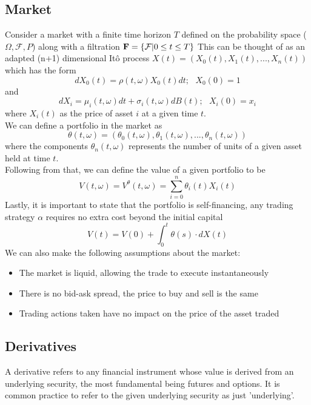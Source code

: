 \documentclass[12pt]{article}
\numberwithin{equation}{section}
\begin{document}
\subsection{Market}
Consider a market with a finite time horizon $T$ defined on the probability space 
($\Omega,\mathcal{F},P$) along with a filtration $\bold{F} = \{\mathcal{F}| 0 \leq t \leq T \}$ 
This can be thought of as an adapted (n+1) dimensional It\^{o} process 
$X(t) = (X_0(t), X_1(t),...,X_n(t))$
which has the form 
\begin{equation}
dX_0(t) = \rho(t,\omega)X_0(t)dt;\hspace{8pt}X_0(0)=1
\end{equation}and
\begin{equation}
dX_i = \mu_i(t,\omega)dt+\sigma_i(t,\omega)dB(t);\hspace{8pt}X_i(0)=x_i 
\end{equation}
where $X_i(t)$ as the price of asset $i$ at a given time $t$.
\\
We can define a portfolio in the market as 
\begin{equation}
\theta(t,\omega) = (\theta_0(t,\omega),\theta_1(t,\omega),...,\theta_n(t,\omega))
\end{equation}
where the components $\theta_n(t,\omega)$ represents the number of units of a given 
asset held at time $t$.\\
Following from that, we can define the value of a given portfolio to be 
\begin{equation}
  V(t,\omega) = V^{\theta}(t,\omega) = \sum_{i=0}^n \theta_i(t)X_i(t)
\end{equation}
Lastly, it is important to state that the portfolio is self-financing, any 
trading strategy $\alpha$ requires no extra cost beyond the initial capital
\begin{equation}
  V(t) = V(0) + \int_0^t\theta(s)\cdot dX(t)
\end{equation}
We can also make the following assumptions about the market:
\begin{itemize}
  \item The market is liquid, allowing the trade to execute instantaneously
  \item There is no bid-ask spread, the price to buy and sell is the same 
  \item Trading actions taken have no impact on the price of the asset traded 
\end{itemize}


\subsection{Derivatives}
A derivative refers to any financial instrument whose value is derived from an 
underlying security, the most fundamental being futures and options. It is common 
practice to refer to the given underlying security as just 'underlying'.
\end{document}
